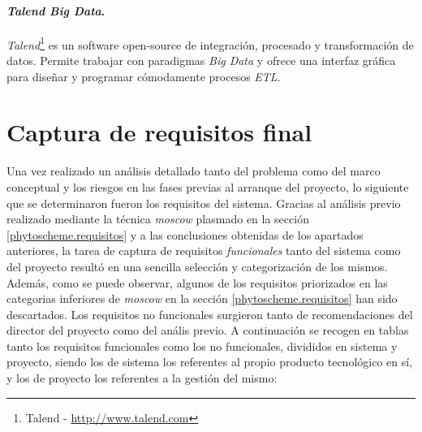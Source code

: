 \paragraph*{\textit{Talend Big Data}.} \textit{Talend}\footnote{Talend - \url{http://www.talend.com}} es un software open-source de integración, procesado y transformación de datos. Permite trabajar con paradigmas \textit{Big Data} y ofrece una interfaz gráfica para diseñar y programar cómodamente procesos \textit{ETL}. 

\section{Captura de requisitos final}  \label{analisis.requisitos}
Una vez realizado un análisis detallado tanto del problema como del marco conceptual y los riesgos en las fases previas al arranque del proyecto, lo  siguiente que se determinaron fueron los requisitos del sistema. Gracias al análisis previo realizado mediante la técnica \textit{\gls{moscow}} plasmado en la sección \ref{phytoscheme.requisitos} y a las conclusiones obtenidas de los apartados anteriores, la tarea de captura de requisitos \textit{funcionales} tanto del sistema como del proyecto resultó en una sencilla selección y categorización de los mismos. Además, como se puede observar, algunos de los requisitos priorizados en las categorias inferiores de \textit{\gls{moscow}} en la sección \ref{phytoscheme.requisitos} han sido descartados. Los requisitos no funcionales surgieron tanto de recomendaciones del director del proyecto como del anális previo. A continuación se recogen en tablas tanto los requisitos funcionales como los no funcionales, divididos en sistema y proyecto, siendo los de sistema los referentes al propio producto tecnológico en sí, y los de proyecto los referentes a la gestión del mismo: \par
